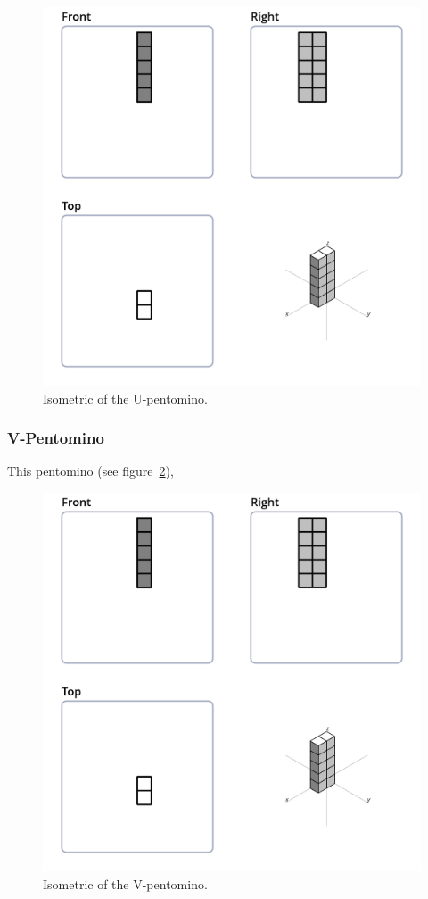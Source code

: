 \begin{figure}
	\centering
	\includegraphics[scale=0.3]{iso_diagrams/o.png}
	\caption{Isometric of the U-pentomino.}
  \label{fig:iso-pent-u}
\end{figure}
\subsubsection{V-Pentomino}
\label{sec:v-pentomino}
This pentomino (see figure~\ref{fig:iso-pent-v}),


\begin{figure}
	\centering
	\includegraphics[scale=0.3]{iso_diagrams/o.png}
	\caption{Isometric of the V-pentomino.}
  \label{fig:iso-pent-v}
\end{figure}

